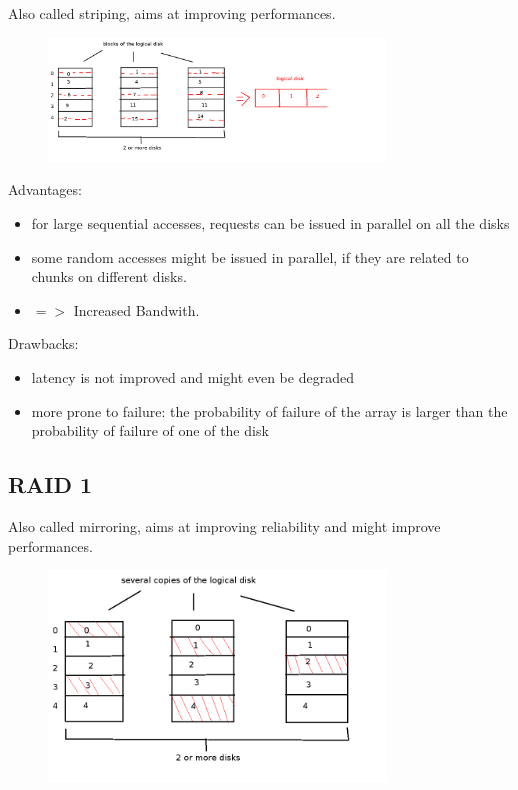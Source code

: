 \documentclass[a4paper,10pt]{report}
\newlength{\larg}
\begin{document}
Also called striping, aims at improving performances.
\begin{figure}[h!]
  \begin{center}
    \includegraphics[width=0.8\textwidth]{raid_0_chunks.png}
    \caption{}
  \end{center}
\end{figure}

Advantages:

\begin{itemize}
  \item for large sequential accesses, requests can be issued in parallel on all the disks
  \item some random accesses might be issued in parallel, if they are related to chunks on different disks.
  \item $=>$ Increased Bandwith.
\end{itemize}

Drawbacks:

\begin{itemize}
  \item latency is not improved and might even be degraded
  \item more prone to failure: the probability of failure of the array is larger than the probability of failure of one of the disk
\end{itemize}

\subsection{RAID 1}

Also called mirroring, aims at improving reliability and might improve performances.

\begin{figure}[h!]
  \begin{center}
    \includegraphics[width=0.8\textwidth]{raid_1.png}
    \caption{}
  \end{center}
\end{figure}
\end{document}
